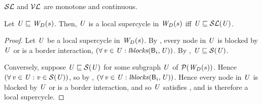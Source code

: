 \begin{proposition} \label{prop:monotoneLoc}
$\lSFs$ and $\lVFs$ are monotone and continuous.
\end{proposition}







\begin{proposition} \label{prop:locGFP} \label{supercycleGFPLoc}
Let $\UU \subg \lwfg{B}{s}{\DS}$. Then, $\US$ is a local supercycle in $\lwfg{B}{s}{\DS}$ iff $\US \subg \lSF{\US}$.
\end{proposition}
%
\begin{proof}
Let $\US$ be a local supercycle in $\lwfg{B}{s}{\DS}$. By , every node in $\US$ is blocked by $\US$ or is a border interaction, \ie 
$(\fa \ndv \in \US: \lblocks{\B_i}{\US})$. By , $\US \subg \SF{\US}$.

Conversely, suppose $\US \subg \SF{\US}$ for some subgraph $\US$ of $\lwfgS{B}{s}{\DS}$. Hence 
$(\fa \ndv \in \US: \ndv \in \SF{\US})$, so by , $(\fa \ndv \in \US: \lblocks{\B_i}{\US})$.
Hence every node in $\US$ is blocked by $\US$ or is a border interaction, and so $\US$ satisfies , and is therefore a local supercycle.
\end{proof}

